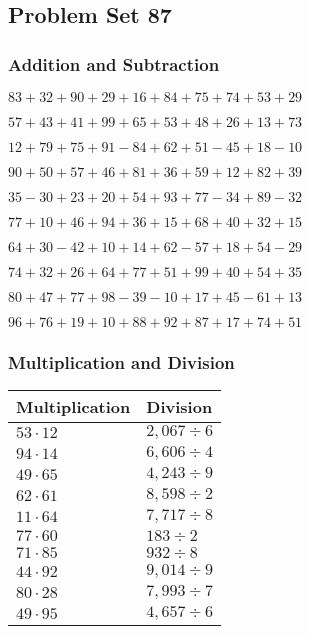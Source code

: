 \hypertarget{problem-set-87}{%
\subsection{Problem Set 87}\label{problem-set-87}}

\hypertarget{addition-and-subtraction}{%
\subsubsection{Addition and
Subtraction}\label{addition-and-subtraction}}

\(83+32+90+29+16+84+75+74+53+29\)

\(57+43+41+99+65+53+48+26+13+73\)

\(12+79+75+91-84+62+51-45+18-10\)

\(90+50+57+46+81+36+59+12+82+39\)

\(35-30+23+20+54+93+77-34+89-32\)

\(77+10+46+94+36+15+68+40+32+15\)

\(64+30-42+10+14+62-57+18+54-29\)

\(74+32+26+64+77+51+99+40+54+35\)

\(80+47+77+98-39-10+17+45-61+13\)

\(96+76+19+10+88+92+87+17+74+51\)

\hypertarget{multiplication-and-division}{%
\subsubsection{Multiplication and
Division}\label{multiplication-and-division}}

\begin{longtable}[]{@{}ll@{}}
\toprule
Multiplication & Division\tabularnewline
\midrule
\endhead
\(53\cdot12\) & \(2,067÷6\)\tabularnewline
\(94\cdot14\) & \(6,606÷4\)\tabularnewline
\(49\cdot65\) & \(4,243÷9\)\tabularnewline
\(62\cdot61\) & \(8,598÷2\)\tabularnewline
\(11\cdot64\) & \(7,717÷8\)\tabularnewline
\(77\cdot60\) & \(183÷2\)\tabularnewline
\(71\cdot85\) & \(932÷8\)\tabularnewline
\(44\cdot92\) & \(9,014÷9\)\tabularnewline
\(80\cdot28\) & \(7,993÷7\)\tabularnewline
\(49\cdot95\) & \(4,657÷6\)\tabularnewline
\bottomrule
\end{longtable}
